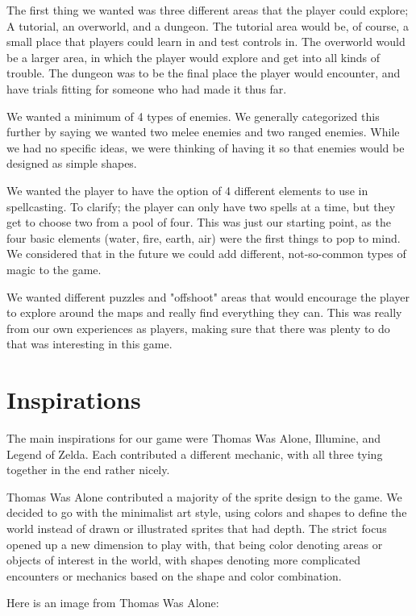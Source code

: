 \documentclass{sigchi}
\begin{document}
The first thing we wanted was three different areas that the player could explore; A tutorial, an overworld, and a dungeon. The tutorial area would be, of course,
a small place that players could learn in and test controls in. The overworld would be a larger area, in which the player would explore and get into all kinds of
trouble. The dungeon was to be the final place the player would encounter, and have trials fitting for someone who had made it thus far.

We wanted a minimum of 4 types of enemies. We generally categorized this further by saying we wanted two melee enemies and two ranged enemies. While
we had no specific ideas, we were thinking of having it so that enemies would be designed as simple shapes.

We wanted the player to have the option of 4 different elements to use in spellcasting. To clarify; the player can only have two spells at a time, but they
get to choose two from a pool of four. This was just our starting point, as the four basic elements (water, fire, earth, air) were the first things to pop to mind.
We considered that in the future we could add different, not-so-common types of magic to the game.

We wanted different puzzles and "offshoot" areas that would encourage the player to explore around the maps and really find everything they can. This was
really from our own experiences as players, making sure that there was plenty to do that was interesting in this game.

\newpage

\section{Inspirations}
The main inspirations for our game were Thomas Was Alone, Illumine, and Legend of Zelda.  Each contributed a different mechanic, with all three tying together in the end rather nicely.

Thomas Was Alone contributed a majority of the sprite design to the game.  We decided to go with the minimalist art style, using colors and shapes to define the world instead of
drawn or illustrated sprites that had depth.  The strict focus opened up a new dimension to play with, that being color denoting areas or objects of interest in the world, with shapes denoting more 
complicated encounters or mechanics based on the shape and color combination.

Here is an image from Thomas Was Alone:
\end{document}
